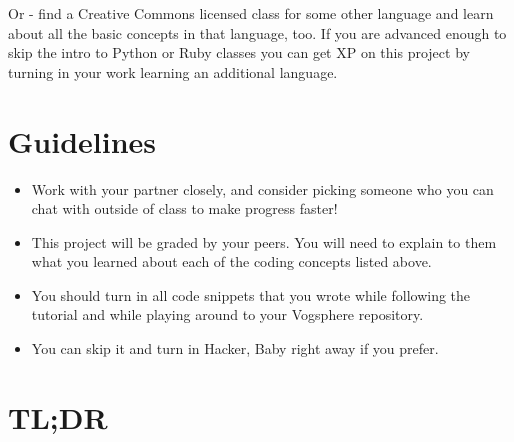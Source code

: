 \documentclass{42-en}
\begin{document}
Or - find a Creative Commons licensed class for some other language and learn about all the basic concepts in that language, too. If you are advanced enough to skip the intro to Python or Ruby classes you can get XP on this project by turning in your work learning an additional language.


\chapter{Guidelines}

\begin{itemize}

  \item Work with your partner closely, and consider picking someone who you can chat with outside of class to make progress faster!

  \item This project will be graded by your peers. You will need to explain to them what you learned about each of the coding concepts listed above.

  \item You should turn in all code snippets that you wrote while following the tutorial and while playing around to your Vogsphere repository.

  \item You can skip it and turn in Hacker, Baby right away if you prefer.

\end{itemize}


\chapter{TL;DR}
\end{document}
